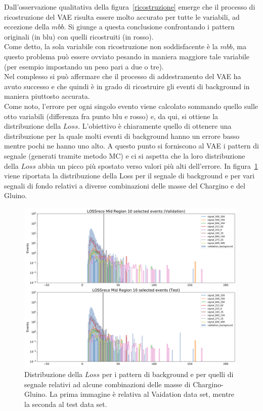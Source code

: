 Dall'osservazione qualitativa della figura~\ref{ricostruzione} emerge che il processo di ricostruzione del VAE risulta essere molto accurato per tutte le variabili, ad eccezione della $\textit{mbb}$. Si giunge a questa conclusione confrontando i pattern originali (in blu) con quelli ricostruiti (in rosso). \\
Come detto, la sola variabile con ricostruzione non soddisfacente è la $\textit{mbb}$, ma questo problema può essere ovviato pesando in maniera maggiore tale variabile (per esempio impostando un peso pari a due o tre).\\
Nel complesso si può affermare che il processo di addestramento del VAE ha avuto successo e che quindi è in grado di ricostruire gli eventi di background in maniera piuttosto accurata. \\ 
Come noto, l'errore per ogni singolo evento viene calcolato sommando quello sulle otto variabili (differenza fra punto blu e rosso) e, da qui, si ottiene la distribuzione della $\textit{Loss}$. L'obiettivo è chiaramente quello di ottenere una distribuzione per la quale molti eventi di background hanno un errore basso mentre pochi ne hanno uno alto. A questo punto si forniscono al VAE i pattern di segnale (generati tramite metodo MC) e ci si aspetta che la loro distribuzione della $\textit{Loss}$ abbia un picco più spostato verso valori più alti dell'errore. In figura~\ref{distribuzione_loss} viene riportata la distribuzione della Loss per il segnale di background e per vari segnali di fondo relativi a diverse combinazioni delle masse del Chargino e del Gluino.

\begin{figure}[h!]
	\centering
	\includegraphics[width=0.99\textwidth]{figs/risultati_simulazione/distribuzioneLoss.png}
	\caption{Distribuzione della $\textit{Loss}$ per i pattern di background e per quelli di segnale relativi ad alcune combinazioni delle masse di Chargino-Gluino. La prima immagine è relativa al Vaidation data set, mentre la seconda al test data set.}
	\label{distribuzione_loss}
\end{figure}

